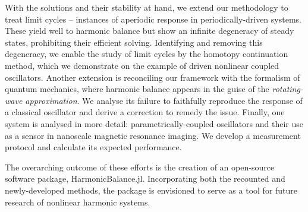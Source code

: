 With the solutions and their stability at hand, we extend our methodology to treat limit cycles – instances of aperiodic response in periodically-driven systems. These yield well to harmonic balance but show an infinite degeneracy of steady states, prohibiting their efficient solving. Identifying and removing this degeneracy, we enable the study of limit cycles by the homotopy continuation method, which we demonstrate on the example of driven nonlinear coupled oscillators. Another extension is reconciling our framework with the formalism of quantum mechanics, where harmonic balance appears in the guise of the \textit{rotating-wave approximation}. We analyse its failure to faithfully reproduce the response of a classical oscillator and derive a correction to remedy the issue. Finally, one system is analysed in more detail: parametrically-coupled oscillators and their use as a sensor in nanoscale magnetic resonance imaging. We develop a measurement protocol and calculate its expected performance.

The overarching outcome of these efforts is the creation of an open-source software package, HarmonicBalance.jl. Incorporating both the recounted and newly-developed methods, the package is envisioned to serve as a tool for future research of nonlinear harmonic systems. 

 

 